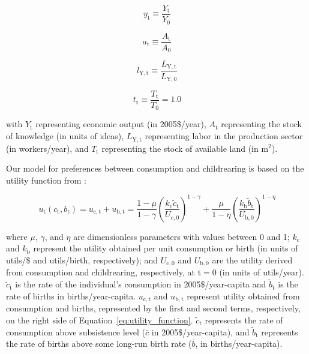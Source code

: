 \documentclass[letterpaper,12pt]{article}
\begin{document}
\begin{equation} \label{eq:index_y}
	y_\mathrm{t} \equiv \frac{Y_\mathrm{t}}{Y_\mathrm{0}}
\end{equation}

\begin{equation} \label{eq:index_a}
	a_\mathrm{t} \equiv \frac{A_\mathrm{t}}{A_\mathrm{0}}
\end{equation}

\begin{equation} \label{eq:index_l}
	l_\mathrm{Y,t} \equiv \frac{L_\mathrm{Y,t}}{L_\mathrm{Y,0}}
\end{equation}

\begin{equation} \label{eq:index_t}
	t_\mathrm{t} \equiv \frac{T_\mathrm{t}}{T_\mathrm{0}} = 1.0
\end{equation}

\noindent with $Y_\mathrm{t}$ representing economic output (in 2005\$/year), $A_\mathrm{t}$ representing the stock of knowledge (in units of ideas), $L_\mathrm{Y,t}$ representing labor in the production sector (in workers/year), and $T_\mathrm{t}$ representing the stock of available land (in m$^2$).

Our model for preferences between consumption and childrearing is based on the utility function from \citet{Jones:2001wn}:

\begin{equation} \label{eq:utility_function}
	u_\mathrm{t}(c_\mathrm{t}, b_\mathrm{t}) = u_\mathrm{c,t} + u_\mathrm{b,t} = \frac{1-\mu}{1-\gamma} \left(\frac{k_\mathrm{c} \tilde c_\mathrm{t}}{U_\mathrm{c,0}} \right)^{1-\gamma} + \frac{\mu}{1-\eta} \left(\frac{k_\mathrm{b} \tilde b_\mathrm{t}}{U_\mathrm{b,0}} \right)^{1-\eta}
\end{equation}

\noindent where $\mu$, $\gamma$, and $\eta$ are dimensionless parameters with values between 0 and 1; $k_\mathrm{c}$ and $k_\mathrm{b}$ represent the utility obtained per unit consumption or birth (in units of utils/\$ and utils/birth, respectively); and $U_{\mathrm{c,0}}$ and $U_{\mathrm{b,0}}$ are the utility derived from consumption and childrearing, respectively, at $\mathrm{t} = 0$ (in units of utils/year). $\tilde c_\mathrm{t}$ is the rate of the individual's consumption in 2005\$/year-capita and $\tilde b_\mathrm{t}$ is the rate of births in births/year-capita. $u_\mathrm{c,t}$ and $u_\mathrm{b,t}$ represent utility obtained from consumption and births, represented by the first and second terms, respectively, on the right side of Equation~\ref{eq:utility_function}. $\tilde c_\mathrm{t}$ represents the rate of consumption above subsistence level ($\bar c$ in 2005\$/year-capita), and $\tilde b_\mathrm{t}$ represents the rate of births above some long-run birth rate ($\bar b$, in births/year-capita).
\end{document}
